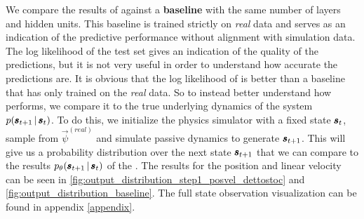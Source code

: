 We compare the results of \dettostoc{} against a \textbf{baseline} \cvae{} with the same number of layers and hidden units. This baseline \cvae{} is trained strictly on \emph{real} data and serves as an indication of the predictive performance without alignment with simulation data.
The log likelihood of the test set gives an indication of the quality of the predictions, but it is not very useful in order to understand how accurate the predictions are. It is obvious that the log likelihood of \dettostoc{} is better than a \cvae{} baseline that has only trained on the \emph{real} data. So to instead better understand how \dettostoc{} performs, we compare it to the true underlying dynamics of the system $p \given{\vns}{\vs}$. To do this, we initialize the physics simulator with a fixed state $\pmb{s}_t$, sample from $\vec{\psi}^{(real)}$ and simulate passive dynamics to generate $\pmb{s}_{t+1}$. This will give us a probability distribution over the next state $\pmb{s}_{t+1}$ that we can compare to the results $\ptheta \given{\vns}{\vs}$ of the \cvae{}. The results for the position and linear velocity can be seen in \ref{fig:output_distribution_step1_posvel_dettostoc} and \ref{fig:output_distribution_baseline}. The full state observation visualization can be found in appendix \ref{appendix}.

